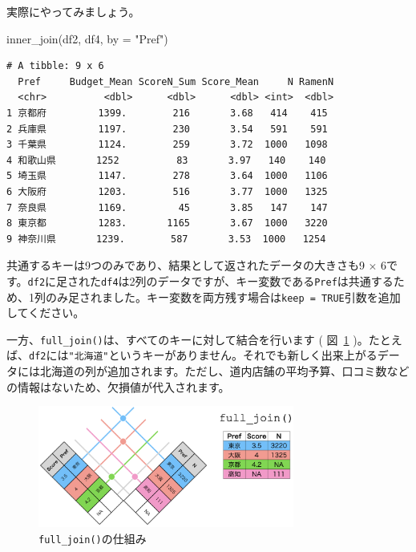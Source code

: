 \documentclass[
  a4paper,
  pandoc,
  ja=standard,
  jafont=haranoaji]{bxjsbook}
\newenvironment{Shaded}{\begin{snugshade}}{\end{snugshade}}
\newcommand{\AttributeTok}[1]{\textcolor[rgb]{0.00,0.48,0.65}{#1}}
\newcommand{\FunctionTok}[1]{\textcolor[rgb]{0.28,0.35,0.67}{#1}}
\newcommand{\NormalTok}[1]{\textcolor[rgb]{0.00,0.48,0.65}{#1}}
\newcommand{\StringTok}[1]{\textcolor[rgb]{0.13,0.47,0.30}{#1}}
\begin{document}
実際にやってみましょう。

\begin{Shaded}
\begin{Highlighting}[numbers=left,,]
\FunctionTok{inner\_join}\NormalTok{(df2, df4, }\AttributeTok{by =} \StringTok{"Pref"}\NormalTok{)}
\end{Highlighting}
\end{Shaded}

\begin{verbatim}
# A tibble: 9 x 6
  Pref     Budget_Mean ScoreN_Sum Score_Mean     N RamenN
  <chr>          <dbl>      <dbl>      <dbl> <int>  <dbl>
1 京都府         1399.        216       3.68   414    415
2 兵庫県         1197.        230       3.54   591    591
3 千葉県         1124.        259       3.72  1000   1098
4 和歌山県       1252          83       3.97   140    140
5 埼玉県         1147.        278       3.64  1000   1106
6 大阪府         1203.        516       3.77  1000   1325
7 奈良県         1169.         45       3.85   147    147
8 東京都         1283.       1165       3.67  1000   3220
9 神奈川県       1239.        587       3.53  1000   1254
\end{verbatim}

共通するキーは9つのみであり、結果として返されたデータの大きさも9
\(\times\)
6です。\texttt{df2}に足された\texttt{df4}は2列のデータですが、キー変数である\texttt{Pref}は共通するため、1列のみ足されました。キー変数を両方残す場合は\texttt{keep\ =\ TRUE}引数を追加してください。

一方、\texttt{full\_join()}は、すべてのキーに対して結合を行います (
図~\ref{fig-handling2_merge_full}
)。たとえば、\texttt{df2}には\texttt{"北海道"}というキーがありません。それでも新しく出来上がるデータには北海道の列が追加されます。ただし、道内店舗の平均予算、口コミ数などの情報はないため、欠損値が代入されます。

\begin{figure}

{\centering \includegraphics[width=0.75\textwidth,height=\textheight]{./Figs/Handling2/Merge_Full.png}

}

\caption{\label{fig-handling2_merge_full}\texttt{full\_join()}の仕組み}

\end{figure}
\end{document}

